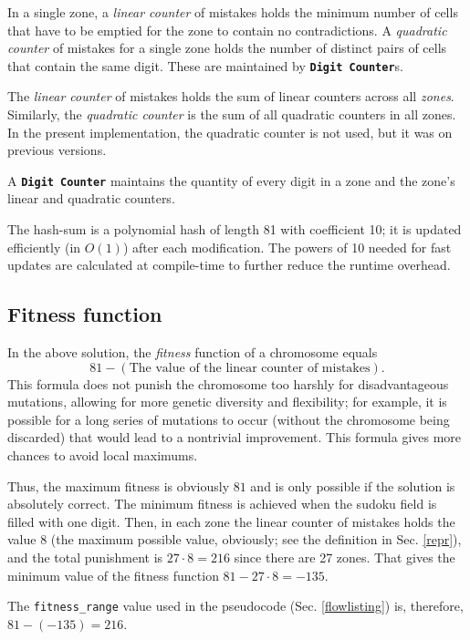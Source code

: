 \documentclass[10pt]{article}
\begin{document}
In a single zone, a \textit{linear counter} of mistakes holds the minimum number of cells that have to be
emptied for the zone to contain no contradictions. A \textit{quadratic counter} of mistakes for a single zone
holds the number of distinct pairs of cells that contain the same digit. These are maintained by \textbf{\texttt{Digit Counter}}s.

The \textit{linear counter} of mistakes holds the sum of linear counters across all \textit{zones}. Similarly,
the \textit{quadratic counter} is the sum of all quadratic counters in all zones. In the present implementation,
the quadratic counter is not used, but it was on previous versions.

A \textbf{\texttt{Digit Counter}} maintains the quantity of every digit in a zone and
the zone's linear and quadratic counters.

The hash-sum is a polynomial hash of length 81 with coefficient 10; it is updated
efficiently (in $O(1)$) after each modification. The powers of 10 needed for
fast updates are calculated at compile-time to further reduce the runtime overhead.

\subsection{Fitness function}\label{fitness}

In the above solution, the \textit{fitness} function of a chromosome equals
\[81 - (\textrm{The value of the linear counter of mistakes}).\]
This formula does not punish the chromosome too harshly for disadvantageous mutations,
allowing for more genetic diversity and flexibility; for example, it is possible for a
long series of mutations to occur (without the chromosome being discarded) that would lead
to a nontrivial improvement. This formula gives more chances to avoid local maximums.

Thus, the maximum fitness is obviously $81$ and is only possible if the solution
is absolutely correct. The minimum fitness is achieved when the sudoku field is
filled with one digit. Then, in each zone the linear counter of mistakes holds the value 8
(the maximum possible value, obviously; see the definition in Sec. \ref{repr}),
and the total punishment is $27\cdot8=216$ since there are 27 zones. That gives
the minimum value of the fitness function $81-27\cdot8=-135$.

The \texttt{fitness\_range} value used in the pseudocode (Sec. \ref{flowlisting}) is,
therefore, $81-(-135)=216$.
\end{document}
